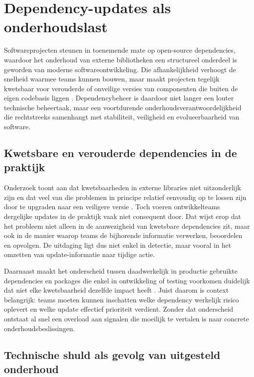 \section{Dependency-updates als onderhoudslast}
\label{sec:dependencybeheer}

Softwareprojecten steunen in toenemende mate op open-source dependencies, waardoor het onderhoud van externe bibliotheken een structureel onderdeel is geworden van moderne softwareontwikkeling. Die afhankelijkheid verhoogt de snelheid waarmee teams kunnen bouwen, maar maakt projecten tegelijk kwetsbaar voor verouderde of onveilige versies van componenten die buiten de eigen codebasis liggen \autocite{Pashchenko2018}. Dependencybeheer is daardoor niet langer een louter technische beheertaak, maar een voortdurende onderhoudsverantwoordelijkheid die rechtstreeks samenhangt met stabiliteit, veiligheid en evolueerbaarheid van software.

\subsection{Kwetsbare en verouderde dependencies in de praktijk}

Onderzoek toont aan dat kwetsbaarheden in externe libraries niet uitzonderlijk zijn en dat veel van die problemen in principe relatief eenvoudig op te lossen zijn door te upgraden naar een veiligere versie \textcite{Pashchenko2018}. Toch voeren ontwikkelteams dergelijke updates in de praktijk vaak niet consequent door. Dat wijst erop dat het probleem niet alleen in de aanwezigheid van kwetsbare dependencies zit, maar ook in de manier waarop teams de bijhorende informatie verwerken, beoordelen en opvolgen. De uitdaging ligt dus niet enkel in detectie, maar vooral in het omzetten van update-informatie naar tijdige actie.

Daarnaast maakt het onderscheid tussen daadwerkelijk in productie gebruikte dependencies en packages die enkel in ontwikkeling of testing voorkomen duidelijk dat niet elke kwetsbaarheid dezelfde impact heeft \textcite{Pashchenko2018}. Juist daarom is context belangrijk: teams moeten kunnen inschatten welke dependency werkelijk risico oplevert en welke update effectief prioriteit verdient. Zonder dat onderscheid ontstaat al snel een overload aan signalen die moeilijk te vertalen is naar concrete onderhoudsbeslissingen.

\subsection{Technische shuld als gevolg van uitgesteld onderhoud}

